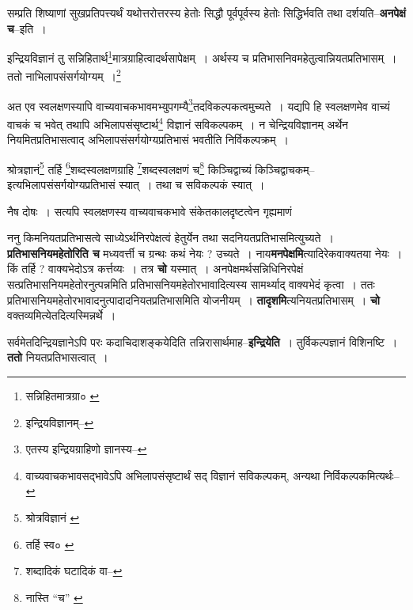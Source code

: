 \documentclass[article,12pt,a4paper]{memoir}
\begin{document}
	  \pstart सम्प्रति शिष्याणां सुखप्रतिपत्त्यर्थं यथोत्तरोत्तरस्य हेतोः सिद्धौ पूर्वपूर्वस्य हेतोः सिद्धिर्भवति तथा दर्शयति--\textbf{अनपेक्षं च}--इति ।
	\pend
	  \bigskip
	  \begingroup
	

	  \pstart इन्द्रियविज्ञानं तु सन्निहितार्थ\footnote{सन्निहितमात्रग्रा० \cite{dp-msA} \cite{dp-edP} \cite{dp-edH} \cite{dp-edE} \cite{dp-edN}}\-मात्रग्राहित्वादर्थसापेक्षम् । अर्थस्य च प्रतिभासनिवमहेतुत्वान्नियतप्रतिभासम् । ततो नाभिलापसंसर्गयोग्यम् ।\footnote{इन्द्रियविज्ञानम्--\cite{dp-msD-n}}
	\pend
       

	  \pstart अत एव स्वलक्षणस्यापि वाच्यवाचकभावमभ्युपगम्यै\footnote{एतस्य इन्द्रियग्राहिणो ज्ञानस्य--\cite{dp-msD-n}}\-तदविकल्पकत्वमुच्यते । यद्यपि हि स्वलक्षणमेव वाच्यं वाचकं च भवेत् तथापि अभिलापसंसृष्टार्थ\footnote{वाच्यवाचकभावसद्भावेऽपि अभिलापसंसृष्टार्थं सद् विज्ञानं सविकल्पकम्, अन्यथा निर्विकल्पकमित्यर्थः--\cite{dp-msD-n}} विज्ञानं सविकल्पकम् । न चेन्द्रियविज्ञानम् अर्थेन नियमितप्रतिभासत्वाद् अभिलापसंसर्गयोग्यप्रतिभासं भवतीति निर्विकल्पक्रम् ।
	\pend
       

	  \pstart श्रोत्रज्ञानं\footnote{श्रोत्रविज्ञानं \cite{dp-msB} \cite{dp-msD} \cite{dp-edN}} तर्हि \footnote{तर्हि स्व० \cite{dp-msB}}\-शब्दस्वलक्षणग्राहि \footnote{शब्दादिकं घटादिकं वा--\cite{dp-msD-n}}\-शब्दस्वलक्षणं च\footnote{नास्ति “च” \cite{dp-msA} \cite{dp-edP} \cite{dp-edH} \cite{dp-edE}} किञ्चिद्वाच्यं किञ्चिद्वाचकम्--इत्यभिलापसंसर्गयोग्यप्रतिभासं स्यात् । तथा च सविकल्पकं स्यात् ।
	\pend
       

	  \pstart नैष दोषः । सत्यपि स्वलक्षणस्य वाच्यवाचकभावे संकेतकालदृष्टत्वेन गृह्यमाणं
	\pend
      
	  \endgroup
	

	  \pstart ननु किमनियतप्रतिभासत्वे साध्येऽर्थनिरपेक्षत्वं हेतुर्येन तथा सदनियतप्रतिभासमित्युच्यते । \textbf{प्रतिभासनियमहेतोरिति च} मध्यवर्त्ती च ग्रन्थः कथं नेयः ? उच्यते । नाय\textbf{मनपेक्षमि}त्यादिरेकवाक्यतया नेयः । किं तर्हि ? वाक्यभेदोऽत्र कर्त्तव्यः । तत्र \textbf{चो} यस्मात् । अनपेक्षमर्थसन्निधिनिरपेक्षं सत्प्रतिभासनियमहेतोरनुत्पन्नमिति प्रतिभासनियमहेतोरभावादित्यस्य सामर्थ्याद् वाक्यभेदं कृत्वा । ततः प्रतिभासनियमहेतोरभावादनुत्पादादनियतप्रतिभासमिति योजनीयम् । \textbf{तादृशमि}त्यनियतप्रतिभासम् । \textbf{चो} वक्तव्यमित्येतदित्यस्मिन्नर्थे ।
	\pend
      

	  \pstart सर्वमेतदिन्द्रियज्ञानेऽपि परः कदाचिदाशङ्कयेदिति तन्निरासार्थमाह--\textbf{इन्द्रियेति} । तुर्विकल्पज्ञानं विशिनष्टि । \textbf{ततो} नियतप्रतिभासत्वात् ।
	\pend
      
\end{document}
